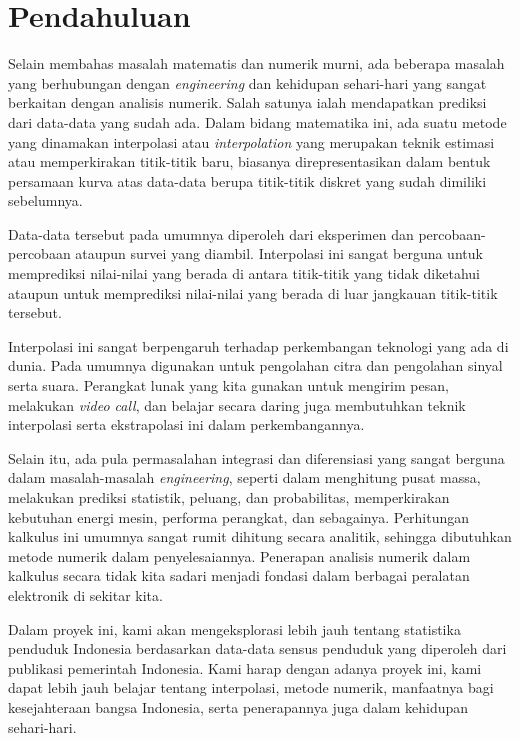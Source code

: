 \documentclass[11pt, a4paper, onecolumn, oneside, final]{report}
\begin{document}
\section*{Pendahuluan}

Selain membahas masalah matematis dan numerik murni, ada beberapa masalah yang berhubungan dengan \textit{engineering} dan kehidupan sehari-hari yang sangat berkaitan dengan analisis numerik. Salah satunya ialah mendapatkan prediksi dari data-data yang sudah ada. Dalam bidang matematika ini, ada suatu metode yang dinamakan interpolasi atau \textit{interpolation} yang merupakan teknik estimasi atau memperkirakan titik-titik baru, biasanya direpresentasikan dalam bentuk persamaan kurva atas data-data berupa titik-titik diskret yang sudah dimiliki sebelumnya.

Data-data tersebut pada umumnya diperoleh dari eksperimen dan percobaan-percobaan ataupun survei yang diambil. Interpolasi ini sangat berguna untuk memprediksi nilai-nilai yang berada di antara titik-titik yang tidak diketahui ataupun untuk memprediksi nilai-nilai yang berada di luar jangkauan titik-titik tersebut.

Interpolasi ini sangat berpengaruh terhadap perkembangan teknologi yang ada di dunia. Pada umumnya digunakan untuk pengolahan citra dan pengolahan sinyal serta suara. Perangkat lunak yang kita gunakan untuk mengirim pesan, melakukan \textit{video call}, dan belajar secara daring juga membutuhkan teknik interpolasi serta ekstrapolasi ini dalam perkembangannya.

Selain itu, ada pula permasalahan integrasi dan diferensiasi yang sangat berguna dalam masalah-masalah \textit{engineering}, seperti dalam menghitung pusat massa, melakukan prediksi statistik, peluang, dan probabilitas, memperkirakan kebutuhan energi mesin, performa perangkat, dan sebagainya. Perhitungan kalkulus ini umumnya sangat rumit dihitung secara analitik, sehingga dibutuhkan metode numerik dalam penyelesaiannya. Penerapan analisis numerik dalam kalkulus secara tidak kita sadari menjadi fondasi dalam berbagai peralatan elektronik di sekitar kita. 

Dalam proyek ini, kami akan mengeksplorasi lebih jauh tentang statistika penduduk Indonesia berdasarkan data-data sensus penduduk yang diperoleh dari publikasi pemerintah Indonesia. Kami harap dengan adanya proyek ini, kami dapat lebih jauh belajar tentang interpolasi, metode numerik, manfaatnya bagi kesejahteraan bangsa Indonesia, serta penerapannya juga dalam kehidupan sehari-hari.
\end{document}
